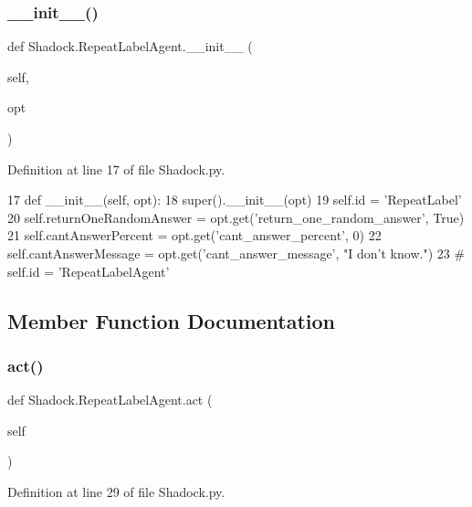\subsubsection{\texorpdfstring{\+\_\+\+\_\+init\+\_\+\+\_\+()}{\_\_init\_\_()}}
{\footnotesize\ttfamily def Shadock.\+Repeat\+Label\+Agent.\+\_\+\+\_\+init\+\_\+\+\_\+ (\begin{DoxyParamCaption}\item[{}]{self,  }\item[{}]{opt }\end{DoxyParamCaption})}



Definition at line 17 of file Shadock.\+py.


\begin{DoxyCode}
17     \textcolor{keyword}{def }\_\_init\_\_(self, opt):
18         super().\_\_init\_\_(opt)
19         self.id = \textcolor{stringliteral}{'RepeatLabel'}
20         self.returnOneRandomAnswer = opt.get(\textcolor{stringliteral}{'return\_one\_random\_answer'}, \textcolor{keyword}{True})
21         self.cantAnswerPercent = opt.get(\textcolor{stringliteral}{'cant\_answer\_percent'}, 0)
22         self.cantAnswerMessage = opt.get(\textcolor{stringliteral}{'cant\_answer\_message'}, \textcolor{stringliteral}{"I don't know."})
23         \textcolor{comment}{# self.id = 'RepeatLabelAgent'}
\end{DoxyCode}


\subsection{Member Function Documentation}
\mbox{\label{classShadock_1_1RepeatLabelAgent_afdec22b589734f9af92ef4234df5d5a1}} 
\subsubsection{\texorpdfstring{act()}{act()}}
{\footnotesize\ttfamily def Shadock.\+Repeat\+Label\+Agent.\+act (\begin{DoxyParamCaption}\item[{}]{self }\end{DoxyParamCaption})}



Definition at line 29 of file Shadock.\+py.


